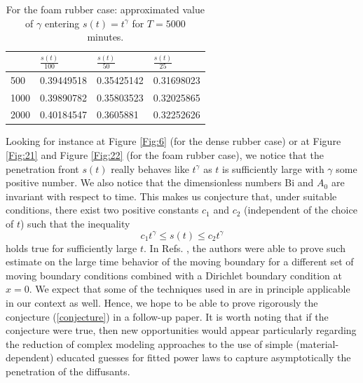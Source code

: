 \documentclass{article}
\begin{document}
\begin {table}[h]
\begin{center}
	\begin{tabular}{ |p{2.5cm}|p{2cm}|p{2cm}| p{2cm}|}
		\hline
		\diagbox{$a_0$}{$\sigma(s(t))$} & $\frac{s(t)}{100}$&$\frac{s(t)}{50}$& $\frac{s(t)}{25}$\\
		\hline
		500 & 0.39449518 & 0.35425142& 0.31698023\\
		1000  & 0.39890782& 0.35803523 & 0.32025865 \\
		2000  &0.40184547 & 0.3605881 & 0.32252626\\
		\hline
	\end{tabular}
	\caption {For the foam rubber case: approximated value of  $\gamma$ entering  $s(t) = t^\gamma$ for $T = 5000$ minutes.}
	\label{tab:4} 
\end{center}
\end {table}
Looking for instance at Figure \ref{Fig:6} (for the dense rubber case) or at Figure \ref{Fig:21} and Figure \ref{Fig:22} (for the foam rubber case), we notice that the penetration front $s(t)$ really behaves like $t^{\gamma}$ as $t$ is sufficiently large with $\gamma$ some positive number. We also notice that the dimensionless numbers Bi and $A_0$ are invariant with respect to time.  This makes us conjecture that, under suitable conditions,  there exist two positive constants $c_1$ and $c_2$ (independent of the choice of $t$)  such that the inequality
\begin{equation}\label{conjecture}
c_1t^{\gamma}\leq s(t)\leq c_2t^{\gamma}
\end{equation}
holds true for sufficiently large $t$. In Refs. \cite{aiki2011free,aiki2013large},  the authors were able to prove such estimate on the large time behavior of the moving boundary for a different set of  moving boundary conditions combined with a Dirichlet boundary condition at $x=0$. We expect that some of the techniques used in \cite{aiki2011free} %
are in principle applicable in our context as well. Hence,  we hope to be able to prove rigorously  the conjecture (\ref{conjecture}) in a follow-up paper. It is worth noting that if the conjecture were true, then new opportunities would appear particularly regarding the reduction of complex modeling approaches to the use of simple (material-dependent) educated guesses for fitted power laws to capture asymptotically the  penetration of the diffusants.
\end{document}

